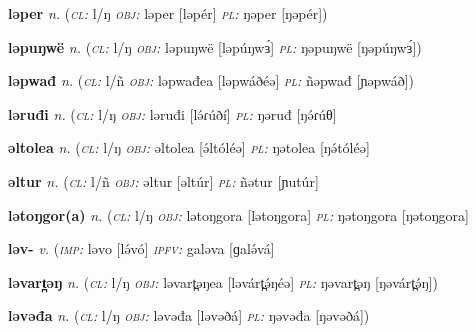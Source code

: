 \newentry
\headword\textbf{ləper} 
\ipa{[ləpér]}
\synpos\textit{n.} 
\class(\textit{\textsc{cl:}} {l/ŋ}
\object\textit{\textsc{obj:}} ləper [ləpér]
\plural\textit{\textsc{pl:}} ŋəper [ŋəpér])

\newentry
\headword\textbf{ləpuŋwë} 
\synpos\textit{n.} 
\class(\textit{\textsc{cl:}} {l/ŋ}
\object\textit{\textsc{obj:}} ləpuŋwë [ləpúŋwɜ́]
\plural\textit{\textsc{pl:}} ŋəpuŋwë [ŋəpúŋwɜ́])

\newentry
\headword\textbf{ləpwađ} 
\ipa{[ləpwáð]}
\synpos\textit{n.} 
\class(\textit{\textsc{cl:}} {l/ñ}
\object\textit{\textsc{obj:}} ləpwađea [ləpwáðéə]
\plural\textit{\textsc{pl:}} ñəpwađ [ɲəpwáð])

\newentry
\headword\textbf{ləruđi} 
\ipa{[lə́ɾúθ]}
\synpos\textit{n.} 
\class(\textit{\textsc{cl:}} {l/ŋ}
\object\textit{\textsc{obj:}} ləruđi [lə́ɾúðí]
\plural\textit{\textsc{pl:}} ŋəruđ [ŋə́ɾúθ]

\newentry
\headword\textbf{əltolea}
\ipa{[ə́ltóléə}
\synpos\textit{n.} 
\class(\textit{\textsc{cl:}} {l/ŋ}
\object\textit{\textsc{obj:}} əltolea [ə́ltóléə] %
\plural\textit{\textsc{pl:}} ŋətolea [ŋə́tóléə] 

\newentry
\headword\textbf{əltur}
\ipa{[əltúr}
\synpos\textit{n.} 
\class(\textit{\textsc{cl:}} {l/ñ}
\object\textit{\textsc{obj:}} əltur [əltúr]  
\plural\textit{\textsc{pl:}} ñətur [ɲutúr] 

\newentry
\headword\textbf{lətoŋgor(a)}
\ipa{[lətoŋgor(a)}
\synpos\textit{n.} 
\class(\textit{\textsc{cl:}} {l/ŋ}
\object\textit{\textsc{obj:}} lətoŋgora [lətoŋgora]
\plural\textit{\textsc{pl:}} ŋətoŋgora [ŋətoŋgora] 

\newentry
\headword\textbf{ləv-}  
\ipa{[lə́v-]}
\synpos\textit{v.} 
\imperative(\textit {\textsc{imp:}} ləvo [lə́vó]  
\imperfective\textit{\textsc{ipfv:}} galəva [ɡalə́vá]

\newentry
\headword\textbf{ləvart̪əŋ}  
\ipa{[ləvárt̪ə́ŋ]}
\synpos\textit{n.} 
\class(\textit{\textsc{cl:}} {l/ŋ}
\object\textit{\textsc{obj:}} ləvart̪əŋea [ləvárt̪ə́ŋéə]
\plural\textit{\textsc{pl:}} ŋəvart̪əŋ [ŋəvárt̪ə́ŋ])

\newentry
\headword\textbf{ləvəđa} 
\ipa{[ləvəðá]}
\synpos\textit{n.} 
\class(\textit{\textsc{cl:}} {l/ŋ}
\object\textit{\textsc{obj:}} ləvəđa [ləvəðá]
\plural\textit{\textsc{pl:}} ŋəvəđa [ŋəvəðá])

